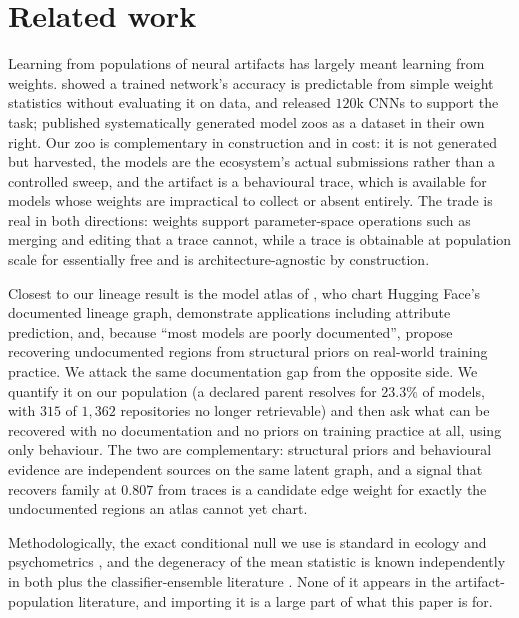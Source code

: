 \documentclass{article}
\begin{document}
\section{Related work}

Learning from populations of neural artifacts has largely meant learning from weights.
\citet{unterthiner2021} showed a trained network's accuracy is predictable from simple weight
statistics without evaluating it on data, and released $120$k CNNs to support the task;
\citet{schurholt2022} published systematically generated model zoos as a dataset in their own
right. Our zoo is complementary in construction and in cost: it is not generated but harvested, the
models are the ecosystem's actual submissions rather than a controlled sweep, and the artifact is a
behavioural trace, which is available for models whose weights are impractical to collect or absent
entirely. The trade is real in both directions: weights support parameter-space operations such
as merging and editing that a trace cannot, while a trace is obtainable at population scale for
essentially free and is architecture-agnostic by construction.

Closest to our lineage result is the model atlas of \citet{horwitz2025}, who chart Hugging Face's
documented lineage graph, demonstrate applications including attribute prediction, and, because
``most models are poorly documented'', propose recovering undocumented regions from structural
priors on real-world training practice. We attack the same documentation gap from the opposite
side. We quantify it on our population (a declared parent resolves for $23.3\%$ of models, with
$315$ of $1{,}362$ repositories no longer retrievable) and then ask what can be recovered with no
documentation and no priors on training practice at all, using only behaviour. The two are
complementary: structural priors and behavioural evidence are independent sources on the same latent
graph, and a signal that recovers family at $0.807$ from traces is a candidate edge weight for
exactly the undocumented regions an atlas cannot yet chart.

Methodologically, the exact conditional null we use is standard in ecology
\citep{schluter1984,gotelli2000,strona2014} and psychometrics
\citep{rasch1960,andersen1973,fleiss1971}, and the degeneracy of the mean statistic is known
independently in both plus the classifier-ensemble literature \citep{kuncheva2003,cronbach1951}.
None of it appears in the artifact-population literature, and importing it is a large part of what
this paper is for.
\end{document}
